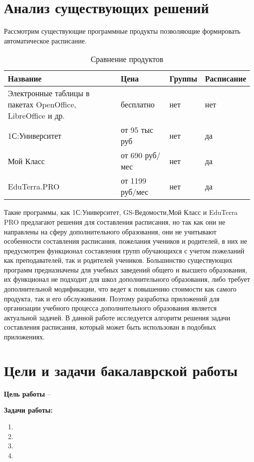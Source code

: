 \section{Анализ существующих решений}

Рассмотрим существующие программные продукты позволяющие формировать автоматическое расписание.

\begin{table}[h!]
\centering
\begin{tabular}{|p{3.5cm}|p{2.5cm}|p{2.5cm}|p{2.5cm}|}
\hline
\textbf{Название} & \textbf{Цена} & \textbf{Группы} & \textbf{Расписание} \\
\hline
Электронные таблицы в пакетах OpenOffice,
LibreOffice и др. & бесплатно & нет & нет \\
\hline
1С:Университет & от 95 тыс руб & нет & да \\
\hline
Мой Класс & от 690 руб/мес & нет & да \\
\hline
EduTerra.PRO & от 1199 руб/мес & нет & да \\
\hline
\end{tabular}
\caption{Сравнение продуктов}
\label{table:products}
\end{table}

Такие программы, как 1С:Университет, GS-Ведомости,Мой Класс и EduTerra PRO предлагают решения для составления расписания, но так как они не направлены на сферу дополнительного образования, они не учитывают особенности составления расписания, пожелания учеников и родителей, в них не предусмотрен функционал составления групп обучающихся с учетом пожеланий как преподавателей, так и родителей учеников. Большинство существующих программ предназначены для учебных заведений общего и высшего образования, их функционал не подходит для школ дополнительного образования, либо требует дополнительной модификации, что ведет к повышению стоимости как самого продукта, так и его обслуживания. Поэтому разработка приложений для организации учебного процесса дополнительного образования является актуальной задачей. В данной работе исследуется алгоритм решения задачи составления расписания, который может быть использован в подобных приложениях.


\section{Цели и задачи бакалаврской работы}

\textbf{Цель работы} -- 

\textbf{Задачи работы:}
\begin{enumerate}
\item 
\item 
\item 
\item 
\end{enumerate}
